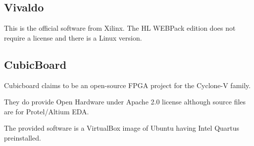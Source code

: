 \subsection{Vivaldo}
This is the official software from Xilinx. The HL WEBPack edition does not require a license and there is a Linux version.
\subsection{CubicBoard}
Cubicboard claims to be an open-source FPGA project for the Cyclone-V family.

They do provide Open Hardware under Apache 2.0 license although source files are for Protel/Altium EDA.

The provided software is a VirtualBox image of Ubuntu having Intel Quartus preinstalled.